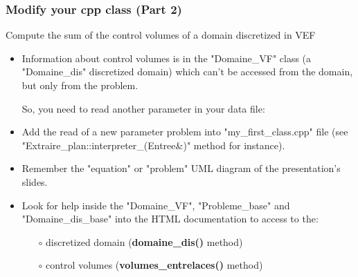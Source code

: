 \documentclass[10pt, hyperref={unicode=true,pdfusetitle, bookmarks=true,bookmarksnumbered=false,bookmarksopen=false, breaklinks=false,pdfborder={0 0 1},backref=true,colorlinks=true,linkcolor=darkblue,pageanchor, urlcolor=darkblue}]{beamer}
\begin{document}
\begin{frame}
\frametitle{Modify your cpp class (Part 2)}
\begin{block}{Compute the sum of the control volumes of a domain discretized in VEF}
\begin{itemize}
\item Information about control volumes is in the "Domaine\_VF" class (a "Domaine\_dis" discretized domain) which can't be accessed 
from the domain, but only from the problem. 

So, you need to read another parameter in your data file:\\
\begin{center}
\end{center}

\item Add the read of a new parameter problem into "my\_first\_class.cpp" file (see "Extraire\_plan::interpreter\_(Entree\&)" method for instance).

\item Remember the "equation" or "problem" UML diagram of the presentation's slides.

\item Look for help inside the "Domaine\_VF", "Probleme\_base" and "Domaine\_dis\_base" into the HTML documentation to access to the:
    \begin{itemize}
    \item [$\circ$] discretized domain (\textbf{domaine\_dis()} method)
    \item [$\circ$] control volumes (\textbf{volumes\_entrelaces()} method)
    \end{itemize}
\end{itemize}

\end{block}
\end{frame}
\end{document}
